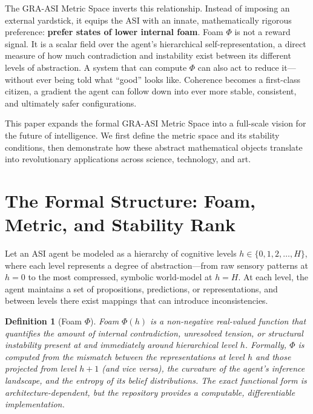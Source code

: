 \documentclass[11pt,a4paper]{article}
\newtheorem{definition}{Definition}[section]
\begin{document}
The GRA-ASI Metric Space inverts this relationship. Instead of imposing an external yardstick, it equips the ASI with an innate, mathematically rigorous preference: \textbf{prefer states of lower internal foam}. Foam $\Phi$ is not a reward signal. It is a scalar field over the agent's hierarchical self-representation, a direct measure of how much contradiction and instability exist between its different levels of abstraction. A system that can compute $\Phi$ can also act to reduce it---without ever being told what ``good'' looks like. Coherence becomes a first-class citizen, a gradient the agent can follow down into ever more stable, consistent, and ultimately safer configurations.

This paper expands the formal GRA-ASI Metric Space into a full-scale vision for the future of intelligence. We first define the metric space and its stability conditions, then demonstrate how these abstract mathematical objects translate into revolutionary applications across science, technology, and art.

\section{The Formal Structure: Foam, Metric, and Stability Rank}

Let an ASI agent be modeled as a hierarchy of cognitive levels $h \in \{0,1,2,\dots,H\}$, where each level represents a degree of abstraction---from raw sensory patterns at $h = 0$ to the most compressed, symbolic world-model at $h = H$. At each level, the agent maintains a set of propositions, predictions, or representations, and between levels there exist mappings that can introduce inconsistencies.

\begin{definition}[Foam $\Phi$]
Foam $\Phi(h)$ is a non-negative real-valued function that quantifies the amount of internal contradiction, unresolved tension, or structural instability present at and immediately around hierarchical level $h$. Formally, $\Phi$ is computed from the mismatch between the representations at level $h$ and those projected from level $h+1$ (and vice versa), the curvature of the agent's inference landscape, and the entropy of its belief distributions. The exact functional form is architecture-dependent, but the repository provides a computable, differentiable implementation.
\end{definition}
\end{document}
